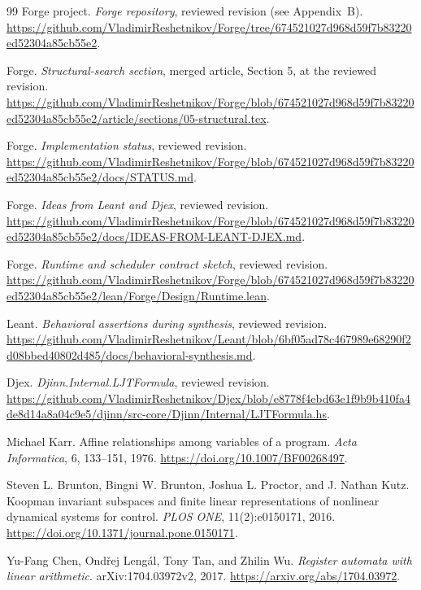 \begin{thebibliography}{99}
Forge project. \emph{Forge repository}, reviewed revision (see Appendix~B).
\url{https://github.com/VladimirReshetnikov/Forge/tree/674521027d968d59f7b83220ed52304a85cb55e2}.

Forge. \emph{Structural-search section}, merged article, Section 5, at the reviewed revision.
\url{https://github.com/VladimirReshetnikov/Forge/blob/674521027d968d59f7b83220ed52304a85cb55e2/article/sections/05-structural.tex}.

Forge. \emph{Implementation status}, reviewed revision.
\url{https://github.com/VladimirReshetnikov/Forge/blob/674521027d968d59f7b83220ed52304a85cb55e2/docs/STATUS.md}.

Forge. \emph{Ideas from Leant and Djex}, reviewed revision.
\url{https://github.com/VladimirReshetnikov/Forge/blob/674521027d968d59f7b83220ed52304a85cb55e2/docs/IDEAS-FROM-LEANT-DJEX.md}.

Forge. \emph{Runtime and scheduler contract sketch}, reviewed revision.
\url{https://github.com/VladimirReshetnikov/Forge/blob/674521027d968d59f7b83220ed52304a85cb55e2/lean/Forge/Design/Runtime.lean}.

Leant. \emph{Behavioral assertions during synthesis}, reviewed revision.
\url{https://github.com/VladimirReshetnikov/Leant/blob/6bf05ad78c467989e68290f2d08bbed40802d485/docs/behavioral-synthesis.md}.

Djex. \emph{Djinn.Internal.LJTFormula}, reviewed revision.
\url{https://github.com/VladimirReshetnikov/Djex/blob/e8778f4ebd63e1f9b9b410fa4de8d14a8a04c9e5/djinn/src-core/Djinn/Internal/LJTFormula.hs}.

Michael Karr. Affine relationships among variables of a program.
\emph{Acta Informatica}, 6, 133--151, 1976.
\url{https://doi.org/10.1007/BF00268497}.

Steven L. Brunton, Bingni W. Brunton, Joshua L. Proctor, and J. Nathan Kutz.
Koopman invariant subspaces and finite linear representations of nonlinear
dynamical systems for control. \emph{PLOS ONE}, 11(2):e0150171, 2016.
\url{https://doi.org/10.1371/journal.pone.0150171}.

Yu-Fang Chen, Ond\v{r}ej Leng\'{a}l, Tony Tan, and Zhilin Wu.
\emph{Register automata with linear arithmetic}. arXiv:1704.03972v2, 2017.
\url{https://arxiv.org/abs/1704.03972}.


\end{thebibliography}
